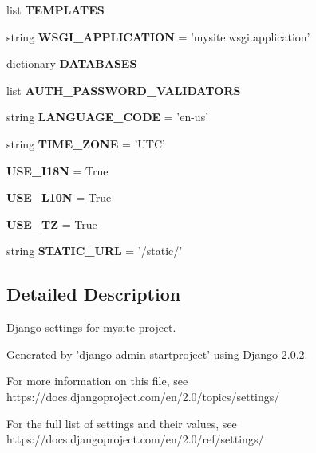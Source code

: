\begin{DoxyCompactItemize}
\item 
list {\bfseries T\-E\-M\-P\-L\-A\-T\-E\-S}
\item 
\hypertarget{namespacesettings_abf78fbe9f53cdb24a12d7d568ae2d656}{string {\bfseries W\-S\-G\-I\-\_\-\-A\-P\-P\-L\-I\-C\-A\-T\-I\-O\-N} = 'mysite.\-wsgi.\-application'}\label{namespacesettings_abf78fbe9f53cdb24a12d7d568ae2d656}

\item 
dictionary {\bfseries D\-A\-T\-A\-B\-A\-S\-E\-S}
\item 
list {\bfseries A\-U\-T\-H\-\_\-\-P\-A\-S\-S\-W\-O\-R\-D\-\_\-\-V\-A\-L\-I\-D\-A\-T\-O\-R\-S}
\item 
\hypertarget{namespacesettings_a25b95b869bf91fec710f4b8c880e5dc8}{string {\bfseries L\-A\-N\-G\-U\-A\-G\-E\-\_\-\-C\-O\-D\-E} = 'en-\/us'}\label{namespacesettings_a25b95b869bf91fec710f4b8c880e5dc8}

\item 
\hypertarget{namespacesettings_a63ae98ba2332c1193f2894c58bf32445}{string {\bfseries T\-I\-M\-E\-\_\-\-Z\-O\-N\-E} = 'U\-T\-C'}\label{namespacesettings_a63ae98ba2332c1193f2894c58bf32445}

\item 
\hypertarget{namespacesettings_af5a1cdb191ae6d79a2c849a275181e2b}{{\bfseries U\-S\-E\-\_\-\-I18\-N} = True}\label{namespacesettings_af5a1cdb191ae6d79a2c849a275181e2b}

\item 
\hypertarget{namespacesettings_acbc48510533411679a26fcda0d2ce4f2}{{\bfseries U\-S\-E\-\_\-\-L10\-N} = True}\label{namespacesettings_acbc48510533411679a26fcda0d2ce4f2}

\item 
\hypertarget{namespacesettings_a15075a434e675e280375cd7513eea855}{{\bfseries U\-S\-E\-\_\-\-T\-Z} = True}\label{namespacesettings_a15075a434e675e280375cd7513eea855}

\item 
\hypertarget{namespacesettings_ac2e18a31bbd962bfc93748bc5d7871b3}{string {\bfseries S\-T\-A\-T\-I\-C\-\_\-\-U\-R\-L} = '/static/'}\label{namespacesettings_ac2e18a31bbd962bfc93748bc5d7871b3}

\end{DoxyCompactItemize}


\subsection{Detailed Description}
\begin{DoxyVerb}Django settings for mysite project.

Generated by 'django-admin startproject' using Django 2.0.2.

For more information on this file, see
https://docs.djangoproject.com/en/2.0/topics/settings/

For the full list of settings and their values, see
https://docs.djangoproject.com/en/2.0/ref/settings/
\end{DoxyVerb}
 

